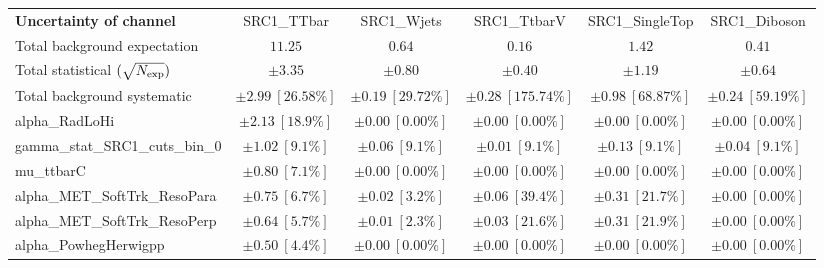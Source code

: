 
\begin{sidewaystable}
\begin{center}
\setlength{\tabcolsep}{0.0pc}
\begin{tabular*}{\textwidth}{@{\extracolsep{\fill}}lccccc}
\noalign{\smallskip}\hline\noalign{\smallskip}
{\bf Uncertainty of channel}                                    & SRC1\_TTbar            & SRC1\_Wjets            & SRC1\_TtbarV            & SRC1\_SingleTop            & SRC1\_Diboson            \\
\noalign{\smallskip}\hline\noalign{\smallskip}
Total background expectation             &  $11.25$        &  $0.64$        &  $0.16$        &  $1.42$        &  $0.41$       \\
\noalign{\smallskip}\hline\noalign{\smallskip}
Total statistical $(\sqrt{N_{\rm exp}})$              & $\pm 3.35$        & $\pm 0.80$        & $\pm 0.40$        & $\pm 1.19$        & $\pm 0.64$       \\
Total background systematic               & $\pm 2.99\ [26.58\%] $        & $\pm 0.19\ [29.72\%] $        & $\pm 0.28\ [175.74\%] $        & $\pm 0.98\ [68.87\%] $        & $\pm 0.24\ [59.19\%] $             \\
\noalign{\smallskip}\hline\noalign{\smallskip}
\noalign{\smallskip}\hline\noalign{\smallskip}
alpha\_RadLoHi         & $\pm 2.13\ [18.9\%] $          & $\pm 0.00\ [0.00\%] $          & $\pm 0.00\ [0.00\%] $          & $\pm 0.00\ [0.00\%] $          & $\pm 0.00\ [0.00\%] $       \\
gamma\_stat\_SRC1\_cuts\_bin\_0         & $\pm 1.02\ [9.1\%] $          & $\pm 0.06\ [9.1\%] $          & $\pm 0.01\ [9.1\%] $          & $\pm 0.13\ [9.1\%] $          & $\pm 0.04\ [9.1\%] $       \\
mu\_ttbarC         & $\pm 0.80\ [7.1\%] $          & $\pm 0.00\ [0.00\%] $          & $\pm 0.00\ [0.00\%] $          & $\pm 0.00\ [0.00\%] $          & $\pm 0.00\ [0.00\%] $       \\
alpha\_MET\_SoftTrk\_ResoPara         & $\pm 0.75\ [6.7\%] $          & $\pm 0.02\ [3.2\%] $          & $\pm 0.06\ [39.4\%] $          & $\pm 0.31\ [21.7\%] $          & $\pm 0.00\ [0.00\%] $       \\
alpha\_MET\_SoftTrk\_ResoPerp         & $\pm 0.64\ [5.7\%] $          & $\pm 0.01\ [2.3\%] $          & $\pm 0.03\ [21.6\%] $          & $\pm 0.31\ [21.9\%] $          & $\pm 0.00\ [0.00\%] $       \\
alpha\_PowhegHerwigpp         & $\pm 0.50\ [4.4\%] $          & $\pm 0.00\ [0.00\%] $          & $\pm 0.00\ [0.00\%] $          & $\pm 0.00\ [0.00\%] $          & $\pm 0.00\ [0.00\%] $       \\

\end{tabular*}
\end{center}
\end{sidewaystable}
